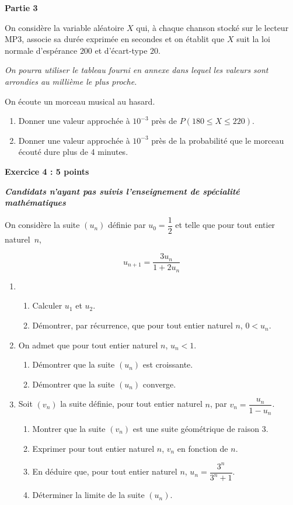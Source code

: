 \documentclass[10pt]{article}
\begin{document}
\medskip

\textbf{Partie 3}

\medskip

On considère la variable aléatoire $X$ qui, à chaque chanson stocké sur le lecteur MP3, associe sa durée exprimée en secondes et on établit que $X$ suit la loi normale d'espérance $200$ et d'écart-type $20$.

\medskip

\emph{On pourra utiliser le tableau fourni en annexe dans lequel les valeurs sont arrondies au millième le plus proche.}

\medskip

On écoute un morceau musical au hasard.
\begin{enumerate}
\item Donner une valeur approchée à $10^{-3}$ près de $P(180 \leqslant X \leqslant 220)$.
\item Donner une valeur approchée à $10^{-3}$ près de la probabilité que le morceau écouté dure plus de 4 minutes.
\end{enumerate}

\newpage

\textbf{Exercice 4 :  \hfill 5 points}

\emph{\bfseries Candidats n'ayant pas suivis l'enseignement de spécialité mathématiques}

\medskip

On considère la suite $(u_n)$ définie par $u_0=\dfrac{1}{2}$ et telle que pour tout entier naturel~$n$, 

\[u_{n+1} = \dfrac{3u_n}{1+2u_n}\]

\begin{enumerate}
\item
  	\begin{enumerate}
  		\item Calculer $u_1$ et $u_2$.
  		\item Démontrer, par récurrence, que pour tout entier naturel $n$, $0 < u_n$.
  	\end{enumerate}
\item On admet que pour tout entier naturel $n$, $u_n<1$.
  	\begin{enumerate}
  		\item Démontrer que la suite $\left(u_n\right)$ est croissante.
  		\item Démontrer que la suite $\left(u_n\right)$ converge.
  	\end{enumerate}
\item Soit $\left(v_n\right)$ la suite définie, pour tout entier naturel $n$, par $v_n = \dfrac{u_n}{1 - u_n}$.
  	\begin{enumerate}
  		\item Montrer que la suite $(v_n)$ est une suite géométrique de raison 3.
  		\item Exprimer pour tout entier naturel $n$, $v_n$ en fonction de $n$.
  		\item En déduire que, pour tout entier naturel $n$, $u_n = \dfrac{3^n}{3^n+1}$.
  		\item Déterminer la limite de la suite $(u_n)$.
  	\end{enumerate}
\end{enumerate}
\end{document}
